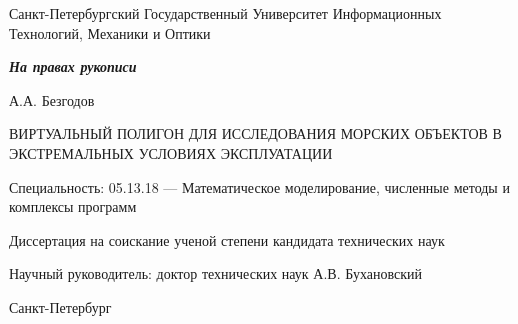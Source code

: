 \begin{titlepage}
\begin{center}

Санкт-Петербургский Государственный Университет Информационных Технологий, Механики и Оптики

\begin{flushright}
\textit{\textbf{На правах рукописи}}
\end{flushright}

\vspace*{0.5in}

\vspace{1.0in}
{\large А.А. Безгодов}
\vspace{0.25in}

{\large ВИРТУАЛЬНЫЙ ПОЛИГОН ДЛЯ ИССЛЕДОВАНИЯ МОРСКИХ ОБЪЕКТОВ В ЭКСТРЕМАЛЬНЫХ УСЛОВИЯХ ЭКСПЛУАТАЦИИ}
\vspace{0.5in}

Специальность: 05.13.18 --- Математическое моделирование, численные методы и комплексы программ
\vspace{0.25in}

Диссертация на соискание ученой степени  \linebreak
кандидата технических наук
\vspace{0.5in}

\begin{flushright}
Научный руководитель: \linebreak
доктор технических наук \linebreak
А.В. Бухановский \linebreak
\end{flushright}

\vspace{1.0in}
Санкт-Петербург  



\end{center}
\end{titlepage}
